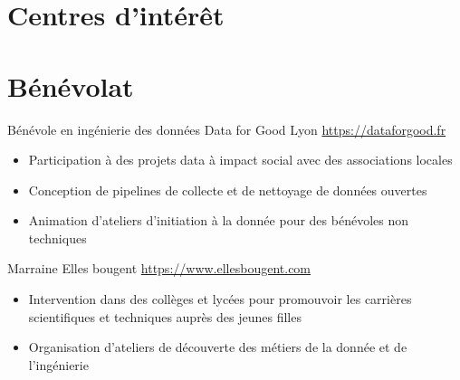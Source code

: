 \documentclass[a4paper, serif, 10pt]{moderncv}
\begin{document}
\section{Centres d'intérêt}

\section{Bénévolat}

        {Bénévole en ingénierie des données}
        {Data for Good Lyon}
        {\url{https://dataforgood.fr}}
        {}
        {\begin{itemize}
\item Participation à des projets data à impact social avec des associations locales
\item Conception de pipelines de collecte et de nettoyage de données ouvertes
\item Animation d'ateliers d'initiation à la donnée pour des bénévoles non techniques
\end{itemize}}
    

        {Marraine}
        {Elles bougent}
        {\url{https://www.ellesbougent.com}}
        {}
        {\begin{itemize}
\item Intervention dans des collèges et lycées pour promouvoir les carrières scientifiques et techniques auprès des jeunes filles
\item Organisation d'ateliers de découverte des métiers de la donnée et de l'ingénierie
\end{itemize}}
    
\end{document}
